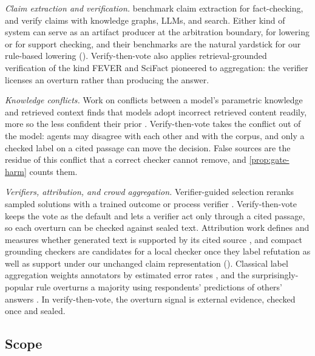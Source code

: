\emph{Claim extraction and verification.} \citet{ullrich2025claim} benchmark claim extraction for fact-checking, and \citet{kolli2025hybrid} verify claims with knowledge graphs, LLMs, and search. Either kind of system can serve as an artifact producer at the arbitration boundary, for lowering or for support checking, and their benchmarks are the natural yardstick for our rule-based lowering (). Verify-then-vote also applies retrieval-grounded verification of the kind FEVER and SciFact pioneered \citep{thorne2018fever,wadden2020scifact} to aggregation: the verifier licenses an overturn rather than producing the answer.

\emph{Knowledge conflicts.} Work on conflicts between a model's parametric knowledge and retrieved context \citep{xu2024knowledge} finds that models adopt incorrect retrieved content readily, more so the less confident their prior \citep{wu2024clasheval}. Verify-then-vote takes the conflict out of the model: agents may disagree with each other and with the corpus, and only a checked label on a cited passage can move the decision. False sources are the residue of this conflict that a correct checker cannot remove, and \cref{prop:gate-harm} counts them.

\emph{Verifiers, attribution, and crowd aggregation.} Verifier-guided selection reranks sampled solutions with a trained outcome or process verifier \citep{cobbe2021verifiers,lightman2024verify}. Verify-then-vote keeps the vote as the default and lets a verifier act only through a cited passage, so each overturn can be checked against sealed text. Attribution work defines and measures whether generated text is supported by its cited source \citep{rashkin2023ais,gao2023alce}, and compact grounding checkers \citep{tang2024minicheck} are candidates for a local checker once they label refutation as well as support under our unchanged claim representation (). Classical label aggregation weights annotators by estimated error rates \citep{dawid1979maximum}, and the surprisingly-popular rule overturns a majority using respondents' predictions of others' answers \citep{prelec2017solution}. In verify-then-vote, the overturn signal is external evidence, checked once and sealed.

\subsection{Scope}
\label{sec:limitations}

